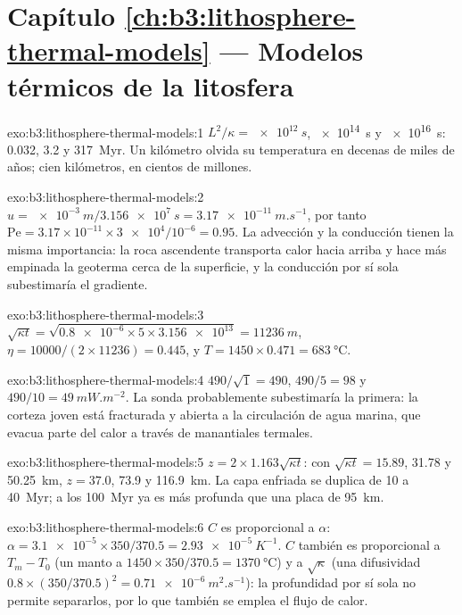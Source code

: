 \section*{Capítulo \ref{ch:b3:lithosphere-thermal-models} --- Modelos térmicos de la litosfera}

\begin{solution}{exo:b3:lithosphere-thermal-models:1}
$L^2/\kappa = \qty{e12}{s}$, \qty{e14}{s} y \qty{e16}{s}: 0.032, 3.2 y
\qty{317}{Myr}. Un kilómetro olvida su temperatura en decenas de miles de
años; cien kilómetros, en cientos de millones.
\end{solution}

\begin{solution}{exo:b3:lithosphere-thermal-models:2}
$u = \qty{e-3}{m}/\qty{3.156e7}{s} = \qty{3.17e-11}{m.s^{-1}}$, por tanto
$\mathrm{Pe} = 3.17\times10^{-11}\times\num{3e4}/10^{-6} = 0.95$. La advección y
la conducción tienen la misma importancia: la roca ascendente transporta calor hacia arriba
y hace más empinada la geoterma cerca de la superficie, y la conducción por sí sola
subestimaría el gradiente.
\end{solution}

\begin{solution}{exo:b3:lithosphere-thermal-models:3}
$\sqrt{\kappa t} = \sqrt{\num{0.8e-6}\times5\times\num{3.156e13}} =
\qty{11236}{m}$, $\eta = 10000/(2\times11236) = 0.445$, y $T = 1450\times0.471
= \qty{683}{\celsius}$.
\end{solution}

\begin{solution}{exo:b3:lithosphere-thermal-models:4}
$490/\sqrt1 = 490$, $490/5 = 98$ y $490/10 = \qty{49}{mW.m^{-2}}$. La sonda
probablemente subestimaría la primera: la corteza joven está fracturada y abierta a
la circulación de agua marina, que evacua parte del calor a través de manantiales termales.
\end{solution}

\begin{solution}{exo:b3:lithosphere-thermal-models:5}
$z = 2\times1.163\sqrt{\kappa t}$: con $\sqrt{\kappa t} = 15.89$, 31.78 y
\qty{50.25}{km}, $z = 37.0$, 73.9 y \qty{116.9}{km}. La capa enfriada se duplica
de 10 a \qty{40}{Myr}; a los \qty{100}{Myr} ya es más profunda que una
placa de \qty{95}{km}.
\end{solution}

\begin{solution}{exo:b3:lithosphere-thermal-models:6}
$C$ es proporcional a $\alpha$: $\alpha = \num{3.1e-5}\times350/370.5 =
\qty{2.93e-5}{K^{-1}}$. $C$ también es proporcional a $T_m - T_0$ (un manto a
$1450\times350/370.5 = \qty{1370}{\celsius}$) y a $\sqrt\kappa$ (una
difusividad $0.8\times(350/370.5)^2 = \qty{0.71e-6}{m^2.s^{-1}}$): la profundidad por sí sola
no permite separarlos, por lo que también se emplea el flujo de calor.
\end{solution}

